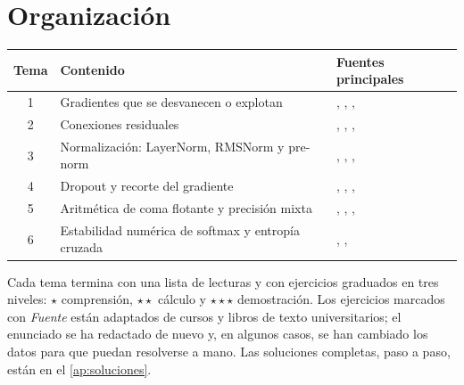 \documentclass[11pt,a4paper,twoside,openany]{book}
\begin{document}
\section*{Organización}
\begin{center}
\begin{tabular}{@{}cll@{}}
\toprule
Tema & Contenido & Fuentes principales \\
\midrule
1 & Gradientes que se desvanecen o explotan & \cite{gbc}, \cite{d2l}, \cite{pascanu}, \cite{glorot} \\
2 & Conexiones residuales & \cite{resnet}, \cite{resnet-id}, \cite{d2l}, \cite{bishopdl} \\
3 & Normalización: LayerNorm, RMSNorm y pre-norm & \cite{layernorm}, \cite{rmsnorm}, \cite{xiong}, \cite{bishopdl} \\
4 & Dropout y recorte del gradiente & \cite{srivastava}, \cite{gbc}, \cite{pascanu}, \cite{cs231n} \\
5 & Aritmética de coma flotante y precisión mixta & \cite{ieee754}, \cite{goldberg}, \cite{micikevicius}, \cite{cs336} \\
6 & Estabilidad numérica de softmax y entropía cruzada & \cite{gbc}, \cite{d2l}, \cite{cs336} \\
\bottomrule
\end{tabular}
\end{center}

Cada tema termina con una lista de lecturas y con ejercicios graduados en tres niveles: $\star$ comprensión, $\star\star$ cálculo y $\star\star\star$ demostración. Los ejercicios marcados con \emph{Fuente} están adaptados de cursos y libros de texto universitarios; el enunciado se ha redactado de nuevo y, en algunos casos, se han cambiado los datos para que puedan resolverse a mano. Las soluciones completas, paso a paso, están en el \cref{ap:soluciones}.
\end{document}
